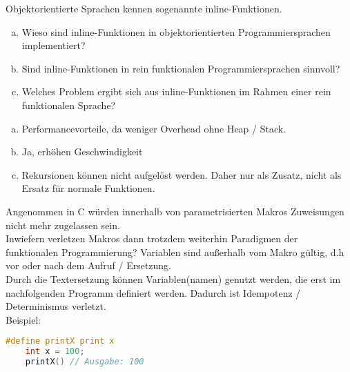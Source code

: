 \begin{card}
	Objektorientierte Sprachen kennen sogenannte inline-Funktionen.
	\begin{enumerate}[a)]
	\item Wieso sind inline-Funktionen in objektorientierten Programmiersprachen implementiert?
	\item Sind inline-Funktionen in rein funktionalen Programmiersprachen sinnvoll?
	\item Welches Problem ergibt sich aus inline-Funktionen im Rahmen einer rein funktionalen Sprache?
	\end{enumerate}
	\hr
	\begin{enumerate}[a)]
	\item Performancevorteile, da weniger Overhead ohne Heap / Stack.
	\item Ja, erhöhen Geschwindigkeit
	\item Rekursionen können nicht aufgelöst werden. Daher nur als Zusatz, nicht als Ersatz für normale Funktionen.
	\end{enumerate}
\end{card}

\begin{card}
	Angenommen in C würden innerhalb von parametrisierten Makros Zuweisungen nicht mehr	zugelassen sein.\\
	Inwiefern verletzen Makros dann trotzdem weiterhin Paradigmen der funktionalen Programmierung?
	\hr
	Variablen sind außerhalb vom Makro gültig, d.h vor oder nach dem Aufruf / Ersetzung.\\
	Durch die Textersetzung können Variablen(namen) genutzt werden, die erst im nachfolgenden Programm definiert werden. Dadurch ist Idempotenz / Determinismus verletzt.\\
	Beispiel:
	\begin{lstlisting}[language=C]
	#define printX print x
	int x = 100;
	printX() // Ausgabe: 100
	\end{lstlisting}
\end{card}
